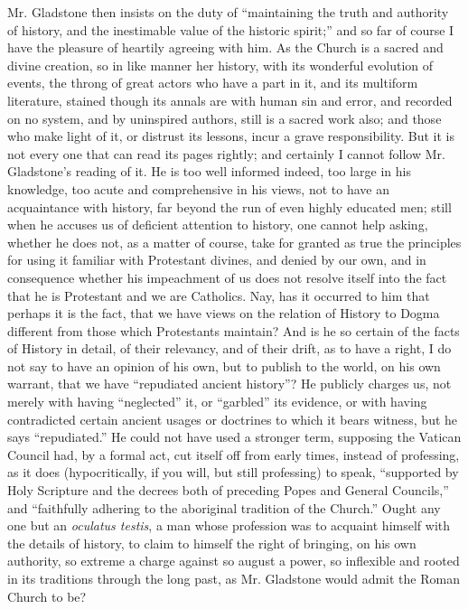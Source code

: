 Mr. Gladstone then insists on the duty of ``maintaining the truth
and authority of history, and the inestimable value of the historic
spirit;'' and so far of course I have the pleasure of heartily
agreeing with him. As the Church is a sacred and divine creation, so in
like manner her history, with its wonderful evolution of events, the
throng of great actors who have a part in it, and its multiform
literature, stained though its annals are with human sin and error, and
recorded on no system, and by uninspired authors, still is a sacred work
also; and those who make light of it, or distrust its lessons, incur a
grave responsibility. But it is not every one that can read its pages
rightly; and certainly I cannot follow Mr. Gladstone's reading of it. He
is too well informed indeed, too large in his knowledge, too acute
and comprehensive in his views, not to have an acquaintance with
history, far beyond the run of even highly educated men; still when he
accuses us of deficient attention to history, one cannot help asking,
whether he does not, as a matter of course, take for granted as true the
principles for using it familiar with Protestant divines, and denied by
our own, and in consequence whether his impeachment of us does not
resolve itself into the fact that he is Protestant and we are Catholics.
Nay, has it occurred to him that perhaps it is the fact, that we have
views on the relation of History to Dogma different from those which
Protestants maintain? And is he so certain of the facts of History in
detail, of their relevancy, and of their drift, as to have a right, I do
not say to have an opinion of his own, but to publish to the world, on
his own warrant, that we have ``repudiated ancient history''? He
publicly charges us, not merely with having ``neglected'' it, or
``garbled'' its evidence, or with having contradicted certain
ancient usages or doctrines to which it bears witness, but he says
``repudiated.'' He could not have used a stronger term,
supposing the Vatican Council had, by a formal act, cut itself off from
early times, instead of professing, as it does (hypocritically, if you
will, but still professing) to speak, ``supported by Holy Scripture
and the decrees both of preceding Popes and General Councils,'' and
``faithfully adhering to the aboriginal tradition of the
Church.'' Ought any one but an \emph{oculatus testis}, a man whose
profession was to acquaint himself with the details of history, to claim
to himself the right of bringing, on his own authority, so extreme
a charge against so august a power, so inflexible and rooted in its
traditions through the long past, as Mr. Gladstone would admit the Roman
Church to be?

